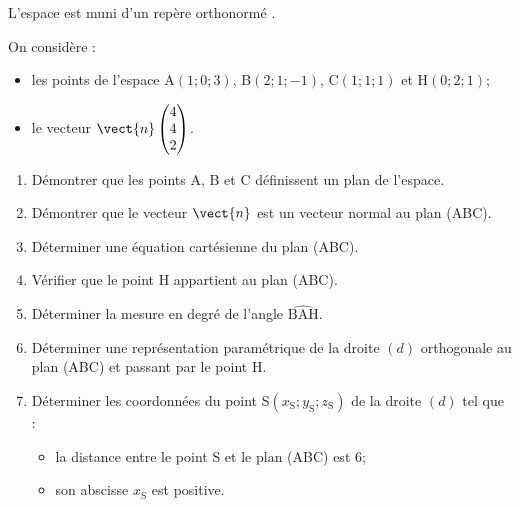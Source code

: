 L'espace est muni d'un repère orthonormé \Oijk{}.

On considère :

\begin{itemize}[label=\textbullet~]
	\item les points de l'espace A$(1 ; 0 ; 3)$, B$(2 ; 1 ;-1)$, C$(1 ; 1 ; 1)$ et H$(0 ; 2 ; 1)$;
	\item le vecteur $\vect{n}\begin{pmatrix}4 \\ 4 \\ 2\end{pmatrix}$.
\end{itemize}

\begin{enumerate}
	\item Démontrer que les points A, B et C définissent un plan de l'espace.

	\item Démontrer que le vecteur $\vect{n}$ est un vecteur normal au plan (ABC).

	\item Déterminer une équation cartésienne du plan (ABC).

	\item Vérifier que le point H appartient au plan (ABC).

	\item Déterminer la mesure en degré de l'angle $\widehat{\mathrm{BAH}}$.

	\item Déterminer une représentation paramétrique de la droite $(d)$ orthogonale au plan (ABC) et passant par le point H.

	\item Déterminer les coordonnées du point S$\left(x_{\mathrm{S}} ; y_{\mathrm{S}} ; z_{\mathrm{S}}\right)$ de la droite $(d)$ tel que :
	\begin{itemize}[label=\textbullet~,left=1cm]
		\item la distance entre le point S et le plan (ABC) est 6;
		\item son abscisse $x_{\mathrm{S}}$ est positive.
	\end{itemize}
\end{enumerate}
